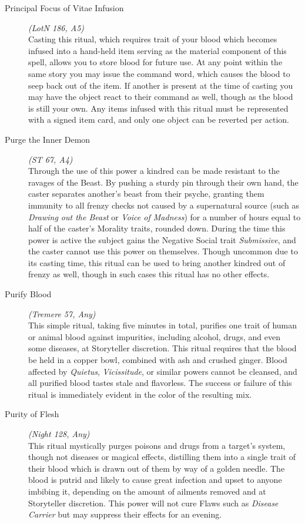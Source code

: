 \begin{description}
	\item[Principal Focus of Vitae Infusion] \emph{(LotN 186, A5)} \hfill \\
	Casting this ritual, which requires trait of your blood which becomes infused into a hand-held item serving as the material 
	component of this spell, allows you to store blood for future use.  At any point within the same story you may issue the 
	command word, which causes the blood to seep back out of the item.  If another is present at the time of casting you may 
	have the object react to their command as well, though as the blood is still your own.  Any items infused with this ritual 
	must be represented with a signed item card, and only one object can be reverted per action. \\

	\item[Purge the Inner Demon] \emph{(ST 67, A4)} \hfill \\
	Through the use of this power a kindred can be made resistant to the ravages of the Beast.  By pushing a sturdy pin through 
	their own hand, the caster separates another's beast from their psyche, granting them immunity to all frenzy checks not 
	caused by a supernatural source (such as \emph{Drawing out the Beast} or \emph{Voice of Madness}) for a number of hours equal 
	to half of the caster's Morality traits, rounded down. During the time this power is active the subject gains the Negative 
	Social trait \emph{Submissive}, and the caster cannot use this power on themselves. Though uncommon due to its casting time, 
	this ritual can be used to bring another kindred out of frenzy as well, though in such cases this ritual has no other effects. \\

	\item[Purify Blood] \emph{(Tremere 57, Any)} \hfill \\
	This simple ritual, taking five minutes in total, purifies one trait of human or animal blood against impurities, including 
	alcohol, drugs, and even some diseases, at Storyteller discretion.  This ritual requires that the blood be held in a copper 
	bowl, combined with ash and crushed ginger.  Blood affected by \emph{Quietus}, \emph{Vicissitude}, or similar powers cannot 
	be cleansed, and all purified blood tastes stale and flavorless. The success or failure of this ritual is immediately 
	evident in the color of the resulting mix. \\
	
	\item[Purity of Flesh] \emph{(Night 128, Any)} \hfill \\
	This ritual mystically purges poisons and drugs from a target's system, though not diseases or magical effects, distilling 
	them into a single trait of their blood which is drawn out of them by way of a golden needle.  The blood is putrid and likely 
	to cause great infection and upset to anyone imbibing it, depending on the amount of ailments removed and at Storyteller 
	discretion.  This power will not cure Flaws such as \emph{Disease Carrier} but may suppress their effects for an evening. \\


\end{description}
